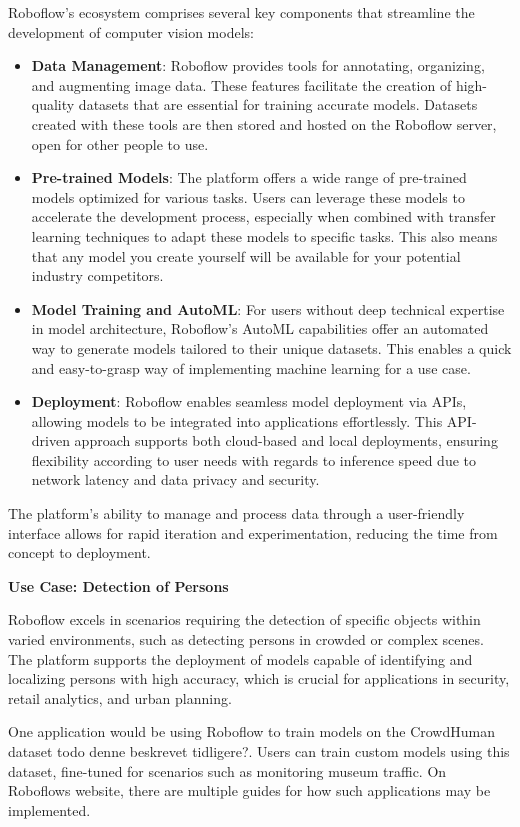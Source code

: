 Roboflow's ecosystem comprises several key components that streamline the development of computer vision models:
\begin{itemize}
    \item \textbf{Data Management}: Roboflow provides tools for annotating, organizing, and augmenting image data. These features facilitate the creation of high-quality datasets that are essential for training accurate models. Datasets created with these tools are then stored and hosted on the Roboflow server, open for other people to use.
    \item \textbf{Pre-trained Models}: The platform offers a wide range of pre-trained models optimized for various tasks. Users can leverage these models to accelerate the development process, especially when combined with transfer learning techniques to adapt these models to specific tasks. This also means that any model you create yourself will be available for your potential industry competitors.
    \item \textbf{Model Training and AutoML}: For users without deep technical expertise in model architecture, Roboflow's AutoML capabilities offer an automated way to generate models tailored to their unique datasets. This enables a quick and easy-to-grasp way of implementing machine learning for a use case.
    \item \textbf{Deployment}: Roboflow enables seamless model deployment via APIs, allowing models to be integrated into applications effortlessly. This API-driven approach supports both cloud-based and local deployments, ensuring flexibility according to user needs with regards to inference speed due to network latency and data privacy and security.
\end{itemize}

The platform's ability to manage and process data through a user-friendly interface allows for rapid iteration and experimentation, reducing the time from concept to deployment.

\textbf{Use Case: Detection of Persons}

Roboflow excels in scenarios requiring the detection of specific objects within varied environments, such as detecting persons in crowded or complex scenes. The platform supports the deployment of models capable of identifying and localizing persons with high accuracy, which is crucial for applications in security, retail analytics, and urban planning.

One application would be using Roboflow to train models on the CrowdHuman dataset todo denne beskrevet tidligere?. Users can train custom models using this dataset, fine-tuned for scenarios such as monitoring museum traffic. On Roboflows website, there are multiple guides for how such applications may be implemented.

